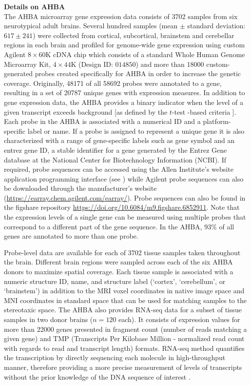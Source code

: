 \documentclass[10pt,A4]{article}
\begin{document}
\textbf{Details on AHBA}\\
The AHBA microarray gene expression data consists of \num{3702} samples from six  neurotypical adult brains. Several hundred samples (mean $\pm$ standard deviation: $617 \pm 241$) were collected from cortical, subcortical, brainstem and cerebellar regions in each brain and profiled for genome-wide gene expression using custom Agilent $8\times60$K cDNA chip which consists of a standard Whole Human Genome Microarray Kit, $4\times44$K (Design ID: $014850$) and more than \num{18000} custom-generated probes created specifically for AHBA in order to increase the genetic coverage. Originally, \num{48171} of all \num{58692} probes were annotated to a gene, resulting in a set of \num{20787} unique genes with expression measures. In addition to gene expression data, the AHBA provides a binary indicator when the level of a given transcript exceeds background [as defined by the $t$-test -based criteria \citep{AHBAdoc}].
Each probe in the AHBA is associated with a numerical ID and a platform-specific label or name. If a probe is assigned to represent a unique gene it is also characterized with a range of gene-specific labels such as gene symbol and an entrez gene ID, a stable identifier for a gene generated by the Entrez Gene database at the National Center for Biotechnology Information (NCBI). If required, probe sequences can be accessed using the Allen Institute’s website application programming interface (see ) while Agilent probe sequences can also be downloaded through the manufacturer's website (\url{https://earray.chem.agilent.com/earray/}). Probe sequences can also be found in the figshare repository \url{https://doi.org/10.6084/m9.figshare.6852911}. Note that the expression levels of a single gene can be measured using multiple probes that correspond to a different part of the gene sequence. In the AHBA, $93\%$ of all genes are annotated to more than one probe.

Probe-level data are available for each of \num{3702} tissue samples taken throughout the brain. Different brain regions were sampled across each of the six AHBA donors to maximize spatial coverage. Each tissue sample is associated with a numeric structure ID, name, and structure label (`cortex', `cerebellum', or `brainstem') in addition to the MRI voxel coordinates in native image space and MNI coordinates in standard space that can be used for matching samples to the stereotaxic space. The AHBA also provides RNA-seq data for a subset of tissue samples in two donor brains ($n=120$ each). It consists of expression values for more than \num{22000} genes presented in fragment count (number of reads matching a given gene) and TMP (Transcripts Per Kilobase Million - normalized read count with regards to read and transcript length) formats. RNA-seq method quantifies the transcription by directly sequencing each molecule in high-throughput manner, therefore providing a more precise measurement of levels of transcripts without the prior knowledge of the DNA sequence of interest \citep{Wang2009}.
\end{document}
